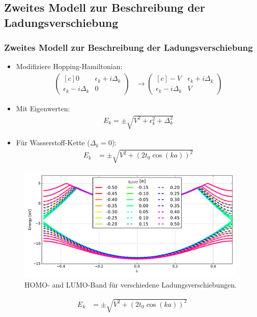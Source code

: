 \subsection{Zweites Modell zur Beschreibung der Ladungsverschiebung}
\begin{frame}
\frametitle{Zweites Modell zur Beschreibung der Ladungsverschiebung}
\begin{itemize}
\item Modifiziere Hopping-Hamiltonian:
\begin{align*}
\begin{pmatrix*}[c]
0 & \epsilon_k + i \Delta_k \\
\epsilon_k - i \Delta_k & 0
\end{pmatrix*} 
&\to 
\begin{pmatrix*}[c]
-V & \epsilon_k + i \Delta_k \\
\epsilon_k - i \Delta_k & V
\end{pmatrix*}
\end{align*}
\item Mit Eigenwerten:
\begin{align*}
E_k = \pm \sqrt{V^2+\epsilon_k^2+\Delta_k^2}
\end{align*}
\item Für Wasserstoff-Kette ($\Delta_k = 0$):
\begin{align*}
E_k &= \pm \sqrt{V^2 + \left(2t_0\cos(ka)\right)^2}
\end{align*}
\end{itemize}
\end{frame}

\begin{frame}
\begin{figure}
\centering
\includegraphics[width = 11cm]{Images/Hydrogen/charging/band_structure_q_1}
\caption{HOMO- and LUMO-Band für verschiedene Ladungsverschiebungen.}
\label{image_hydrogen_charged_bands}
\end{figure}
\begin{align*}
E_k &= \pm \sqrt{V^2 + \left(2t_0\cos(ka)\right)^2}
\end{align*}
\end{frame}

